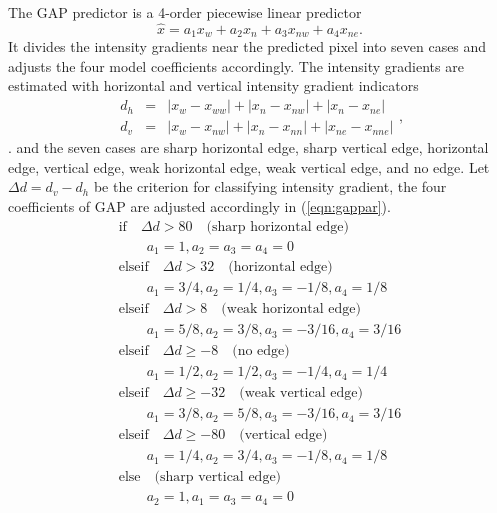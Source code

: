 \documentclass[journal]{IEEEtran}
\begin{document}
The GAP predictor is a 4-order piecewise linear predictor
\begin{equation}\label{eqn:gapo4}
    \hat{x} = a_1x_{w} + a_2x_{n} + a_3x_{nw} + a_4x_{ne} .
\end{equation}
It divides the intensity gradients near the predicted pixel into seven cases and adjusts the four
model coefficients accordingly. The intensity gradients are estimated with horizontal and vertical
intensity gradient indicators 
\begin{equation}\label{eqn:gaphv}
    \begin{array}{rcl}
	d_h & = & |x_w - x_{ww}| + |x_n - x_{nw}| + |x_n - x_{ne}| \\
	d_v & = & |x_w - x_{nw}| + |x_n - x_{nn}| + |x_{ne} - x_{nne}| 
    \end{array}, 
\end{equation}. 
and the seven cases are sharp horizontal edge, sharp vertical edge, horizontal edge, vertical edge,
weak horizontal edge, weak vertical edge, and no edge. Let $\Delta d = d_v - d_h$ be the criterion
for classifying intensity gradient, the four coefficients of GAP are adjusted accordingly in
(\ref{eqn:gappar}).
\begin{equation}\label{eqn:gappar}
    \begin{array}{l}
	\mbox{if} \quad \Delta d > 80 \quad \mbox{(sharp horizontal edge)} \\
	\quad \quad a_1 = 1, a_2 = a_3 = a_4 = 0  \\
	\mbox{elseif} \quad \Delta d > 32 \quad \mbox{(horizontal edge)} \\ 
	\quad \quad a_1 = 3/4, a_2 = 1/4, a_3 = -1/8, a_4 = 1/8 \\
	\mbox{elseif} \quad \Delta d > 8 \quad \mbox{(weak horizontal edge)} \\ 
	\quad \quad a_1 = 5/8, a_2 = 3/8, a_3 = -3/16, a_4 = 3/16 \\
	\mbox{elseif} \quad \Delta d \ge -8 \quad \mbox{(no edge)} \\ 
	\quad \quad a_1 = 1/2, a_2 = 1/2, a_3 = -1/4, a_4 = 1/4 \\
	\mbox{elseif} \quad \Delta d \ge -32 \quad \mbox{(weak vertical edge)} \\ 
	\quad \quad a_1 = 3/8, a_2 = 5/8, a_3 = -3/16, a_4 = 3/16 \\
	\mbox{elseif} \quad \Delta d \ge -80 \quad \mbox{(vertical edge)} \\ 
	\quad \quad a_1 = 1/4, a_2 = 3/4, a_3 = -1/8, a_4 = 1/8 \\
	\mbox{else} \quad \mbox{(sharp vertical edge)} \\
	\quad \quad a_2 = 1, a_1 = a_3 = a_4 = 0 
    \end{array}
\end{equation}
\end{document}
